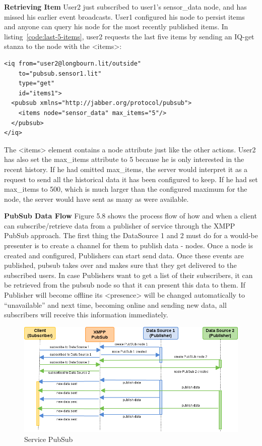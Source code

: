 \textbf{Retrieving Item}
\newline
User2 just subscribed to user1's sensor\_data node, and has missed his earlier event broadcasts.  User1 configured his node to persist items and anyone can query his node for the most recently published items. In listing~\ref{code:last-5-items}, user2 requests the last five items by sending an IQ-get stanza to the node with the <items>:
\begin{lstlisting}[label=code:last-5-items,caption=PubSub: requesting last 5 items from history]
<iq from="user2@longbourn.lit/outside"
    to="pubsub.sensor1.lit"
    type="get"
    id="items1">
  <pubsub xmlns="http://jabber.org/protocol/pubsub">
    <items node="sensor_data" max_items="5"/>
  </pubsub>
</iq>
\end{lstlisting}
The <items> element contains a node attribute just like the other actions. User2 has also set the max\_items attribute to 5 because he is only interested in the recent history. If he had omitted max\_items, the server would interpret it as a request to send all the historical data it has been configured to keep. If he had set max\_items to 500, which is much larger than the configured maximum for the node, the server would have sent as many as were available.

\textbf{PubSub Data Flow}
\newline
Figure 5.8 shows the process flow of how and when a client can subscribe/retrieve data from a publisher of service through the XMPP PubSub approach. The first thing the DataSource 1 and 2 must do for a would-be presenter is to create a channel for them to publish data - nodes. Once a node is created and configured, Publishers can start send data. Once these events are published, pubsub takes over and makes sure that they get delivered to the subscribed users. In case Publishers want to get a list of their subscribers, it can be retrieved from the pubsub node so that it can present this data to them. If Publisher will become offline its <presence> will be changed automatically to ``unavailable'' and next time, becoming online and sending new data, all subscribers will receive this information immediately.
    \begin{figure}[!ht]
    \centering
    \includegraphics[scale=0.6]{images/PubSub.png}   
    \caption[Service PubSub]{Service PubSub}
    \label{img:pub_sub}                           
    \end{figure}
	    
